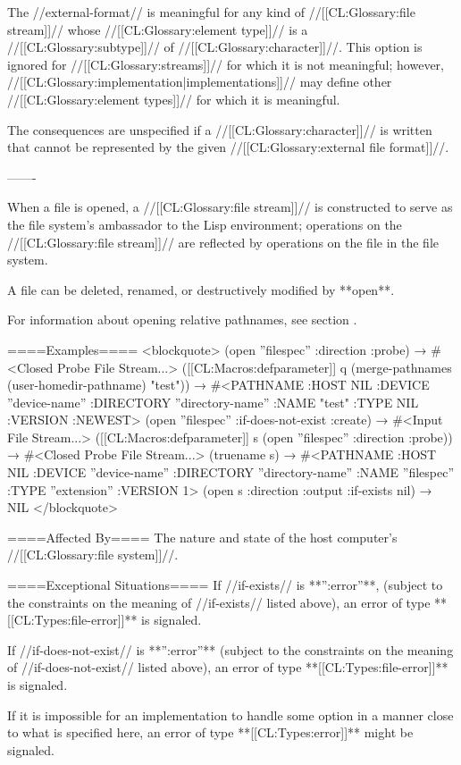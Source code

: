The //external-format// is meaningful for any kind of //[[CL:Glossary:file stream]]// whose //[[CL:Glossary:element type]]// is a //[[CL:Glossary:subtype]]// of //[[CL:Glossary:character]]//. This option is ignored for //[[CL:Glossary:streams]]// for which it is not meaningful; however, //[[CL:Glossary:implementation|implementations]]// may define other //[[CL:Glossary:element types]]// for which it is meaningful.

The consequences are unspecified if a //[[CL:Glossary:character]]// is written that cannot be represented by the given //[[CL:Glossary:external file format]]//.

-------

When a file is opened, a //[[CL:Glossary:file stream]]// is constructed to serve as the file system's ambassador to the Lisp environment; operations on the //[[CL:Glossary:file stream]]// are reflected by operations on the file in the file system.

A file can be deleted, renamed, or destructively modified by **open**.

For information about opening relative pathnames, see section {\secref\MergingPathnames}.

====Examples====
<blockquote> (open ''filespec'' :direction :probe) → #<Closed Probe File Stream...> ([[CL:Macros:defparameter]] q (merge-pathnames (user-homedir-pathname) "test")) → #<PATHNAME :HOST NIL :DEVICE ''device-name'' :DIRECTORY ''directory-name'' :NAME "test" :TYPE NIL :VERSION :NEWEST> (open ''filespec'' :if-does-not-exist :create) → #<Input File Stream...> ([[CL:Macros:defparameter]] s (open ''filespec'' :direction :probe)) → #<Closed Probe File Stream...> (truename s) → #<PATHNAME :HOST NIL :DEVICE ''device-name'' :DIRECTORY ''directory-name'' :NAME ''filespec'' :TYPE ''extension'' :VERSION 1> (open s :direction :output :if-exists nil) → NIL </blockquote>

====Affected By====
The nature and state of the host computer's //[[CL:Glossary:file system]]//.

====Exceptional Situations====
If //if-exists// is **'':error''**, (subject to the constraints on the meaning of //if-exists// listed above), an error of type **[[CL:Types:file-error]]** is signaled.

If //if-does-not-exist// is **'':error''** (subject to the constraints on the meaning of //if-does-not-exist// listed above), an error of type **[[CL:Types:file-error]]** is signaled.

If it is impossible for an implementation to handle some option in a manner close to what is specified here, an error of type **[[CL:Types:error]]** might be signaled.

